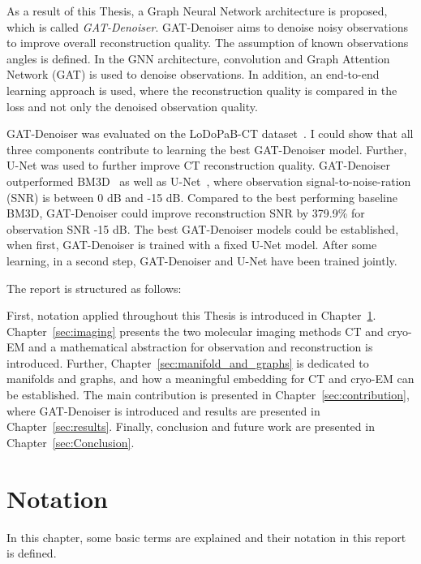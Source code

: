 \clearpage

As a result of this Thesis, a Graph Neural Network architecture is proposed, which is called \textit{GAT-Denoiser}.
GAT-Denoiser aims to denoise noisy observations to improve overall reconstruction quality.
The assumption of known observations angles is defined.
In the GNN architecture, convolution and Graph Attention Network (GAT) is used to denoise observations.
In addition, an end-to-end learning approach is used, where the reconstruction quality is compared in the loss
and not only the denoised observation quality.

GAT-Denoiser was evaluated on the LoDoPaB-CT dataset~\cite{lodopab-dataset}.
I could show that all three components contribute to learning the best GAT-Denoiser model.
Further, U-Net\cite{unet-tomography} was used to further improve CT reconstruction quality.
GAT-Denoiser outperformed BM3D~\cite{bm3d} as well as U-Net~\cite{unet-tomography},
where observation signal-to-noise-ration (SNR) is between 0 dB and -15 dB.
Compared to the best performing baseline BM3D, GAT-Denoiser could improve reconstruction SNR 
by 379.9\% for observation SNR -15 dB.
The best GAT-Denoiser models could be established, when first, GAT-Denoiser is trained with a fixed U-Net model.
After some learning, in a second step, GAT-Denoiser and U-Net have been trained jointly.

\bigskip

The report is structured as follows: 

First, notation applied throughout this Thesis is introduced in Chapter~\ref{sec:notation}.
 Chapter~\ref{sec:imaging} presents the two molecular imaging methods
CT and cryo-EM and a mathematical abstraction for observation and reconstruction is introduced.
Further, Chapter~\ref{sec:manifold_and_graphs} is dedicated to manifolds and graphs,
and how a meaningful embedding for CT and cryo-EM can be established. 
The main contribution is presented in Chapter~\ref{sec:contribution}, 
where GAT-Denoiser is introduced and results are presented in Chapter~\ref{sec:results}.
Finally, conclusion and future work are presented in Chapter~\ref{sec:Conclusion}.

\chapter{Notation}
\label{sec:notation}

In this chapter, some basic terms are explained and their notation in this report is defined.

